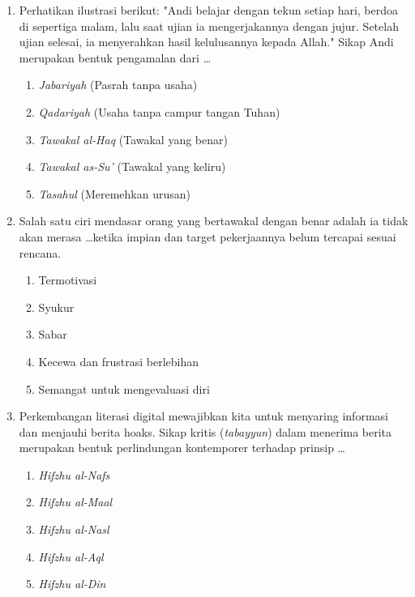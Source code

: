 \documentclass[12pt,a4paper]{article}
\begin{document}
\begin{enumerate}[leftmargin=*]
\item Perhatikan ilustrasi berikut: "Andi belajar dengan tekun setiap hari, berdoa di sepertiga malam, lalu saat ujian ia mengerjakannya dengan jujur. Setelah ujian selesai, ia menyerahkan hasil kelulusannya kepada Allah." Sikap Andi merupakan bentuk pengamalan dari \dots
    \begin{enumerate}[label=\alph*.]
        \item \textit{Jabariyah} (Pasrah tanpa usaha)
        \item \textit{Qadariyah} (Usaha tanpa campur tangan Tuhan)
        \item \textit{Tawakal al-Haq} (Tawakal yang benar)
        \item \textit{Tawakal as-Su'} (Tawakal yang keliru)
        \item \textit{Tasahul} (Meremehkan urusan)
    \end{enumerate}

\item Salah satu ciri mendasar orang yang bertawakal dengan benar adalah ia tidak akan merasa \dots ketika impian dan target pekerjaannya belum tercapai sesuai rencana.
    \begin{enumerate}[label=\alph*.]
        \item Termotivasi
        \item Syukur
        \item Sabar
        \item Kecewa dan frustrasi berlebihan
        \item Semangat untuk mengevaluasi diri
    \end{enumerate}

\item Perkembangan literasi digital mewajibkan kita untuk menyaring informasi dan menjauhi berita hoaks. Sikap kritis (\textit{tabayyun}) dalam menerima berita merupakan bentuk perlindungan kontemporer terhadap prinsip \dots
    \begin{enumerate}[label=\alph*.]
        \item \textit{Hifzhu al-Nafs}
        \item \textit{Hifzhu al-Maal}
        \item \textit{Hifzhu al-Nasl}
        \item \textit{Hifzhu al-Aql}
        \item \textit{Hifzhu al-Din}
    \end{enumerate}

\end{enumerate}
\end{document}
